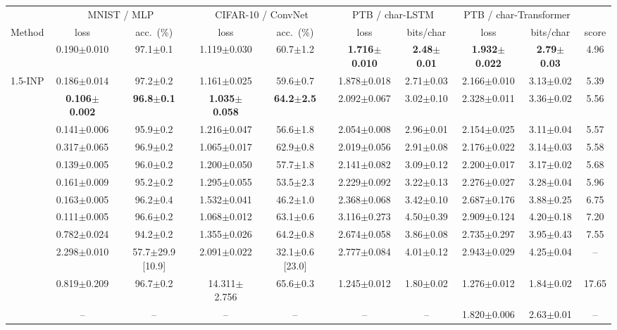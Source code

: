 \begin{tabular}{l cc cc cc cc c}
\toprule
 & \multicolumn{2}{c}{MNIST / MLP} & \multicolumn{2}{c}{CIFAR-10 / ConvNet} & \multicolumn{2}{c}{PTB / char-LSTM} & \multicolumn{2}{c}{PTB / char-Transformer} & \\
\cmidrule(lr){2-3}\cmidrule(lr){4-5}\cmidrule(lr){6-7}\cmidrule(lr){8-9}
Method & loss & acc.\ (\%) & loss & acc.\ (\%) & loss & bits/char & loss & bits/char & score \\
\midrule
\DUST{} & 0.190$\pm$0.010 & 97.1$\pm$0.1 & 1.119$\pm$0.030 & 60.7$\pm$1.2 & \textbf{1.716$\pm$0.010} & \textbf{2.48$\pm$0.01} & \textbf{1.932$\pm$0.022} & \textbf{2.79$\pm$0.03} & 4.96 \\
1.5-INP & 0.186$\pm$0.014 & 97.2$\pm$0.2 & 1.161$\pm$0.025 & 59.6$\pm$0.7 & 1.878$\pm$0.018 & 2.71$\pm$0.03 & 2.166$\pm$0.010 & 3.13$\pm$0.02 & 5.39 \\
\NP{} & \textbf{0.106$\pm$0.002} & \textbf{96.8$\pm$0.1} & \textbf{1.035$\pm$0.058} & \textbf{64.2$\pm$2.5} & 2.092$\pm$0.067 & 3.02$\pm$0.10 & 2.328$\pm$0.011 & 3.36$\pm$0.02 & 5.56 \\
\SPSAb{} & 0.141$\pm$0.006 & 95.9$\pm$0.2 & 1.216$\pm$0.047 & 56.6$\pm$1.8 & 2.054$\pm$0.008 & 2.96$\pm$0.01 & 2.154$\pm$0.025 & 3.11$\pm$0.04 & 5.57 \\
\INP{} & 0.317$\pm$0.065 & 96.9$\pm$0.2 & 1.065$\pm$0.017 & 62.9$\pm$0.8 & 2.019$\pm$0.056 & 2.91$\pm$0.08 & 2.176$\pm$0.022 & 3.14$\pm$0.03 & 5.58 \\
\SPSA{} & 0.139$\pm$0.005 & 96.0$\pm$0.2 & 1.200$\pm$0.050 & 57.7$\pm$1.8 & 2.141$\pm$0.082 & 3.09$\pm$0.12 & 2.200$\pm$0.017 & 3.17$\pm$0.02 & 5.68 \\
\RS{} & 0.161$\pm$0.009 & 95.2$\pm$0.2 & 1.295$\pm$0.055 & 53.5$\pm$2.3 & 2.229$\pm$0.092 & 3.22$\pm$0.13 & 2.276$\pm$0.027 & 3.28$\pm$0.04 & 5.96 \\
\ANPb{} & 0.163$\pm$0.005 & 96.2$\pm$0.4 & 1.532$\pm$0.041 & 46.2$\pm$1.0 & 2.368$\pm$0.068 & 3.42$\pm$0.10 & 2.687$\pm$0.176 & 3.88$\pm$0.25 & 6.75 \\
\ANP{} & 0.111$\pm$0.005 & 96.6$\pm$0.2 & 1.068$\pm$0.012 & 63.1$\pm$0.6 & 3.116$\pm$0.273 & 4.50$\pm$0.39 & 2.909$\pm$0.124 & 4.20$\pm$0.18 & 7.20 \\
\DANP{} & 0.782$\pm$0.024 & 94.2$\pm$0.2 & 1.355$\pm$0.026 & 64.2$\pm$0.8 & 2.674$\pm$0.058 & 3.86$\pm$0.08 & 2.735$\pm$0.297 & 3.95$\pm$0.43 & 7.55 \\
\FF{} & 2.298$\pm$0.010 & 57.7$\pm$29.9 [10.9] & 2.091$\pm$0.022 & 32.1$\pm$0.6 [23.0] & 2.777$\pm$0.084 & 4.01$\pm$0.12 & 2.943$\pm$0.029 & 4.25$\pm$0.04 & -- \\
\BP{} & 0.819$\pm$0.209 & 96.7$\pm$0.2 & 14.311$\pm$2.756 & 65.6$\pm$0.3 & 1.245$\pm$0.012 & 1.80$\pm$0.02 & 1.276$\pm$0.012 & 1.84$\pm$0.02 & 17.65 \\
\IPC{} & -- & -- & -- & -- & -- & -- & 1.820$\pm$0.006 & 2.63$\pm$0.01 & -- \\
\bottomrule
\end{tabular}
